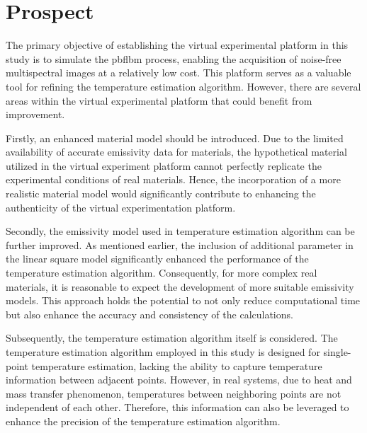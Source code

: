 \newpage
\section*{Prospect}
The primary objective of establishing the virtual experimental platform in this study is to 
simulate the \gls{pbflbm} process, enabling the acquisition of noise-free multispectral 
images at a relatively low cost. This platform serves as a valuable tool for refining 
the temperature estimation algorithm. However, there are several areas within the virtual 
experimental platform that could benefit from improvement.


Firstly, an enhanced material model should be introduced. Due to the limited availability 
of accurate emissivity data for materials, the hypothetical material utilized in the virtual 
experiment platform cannot perfectly replicate the experimental conditions of real materials. 
Hence, the incorporation of a more realistic material model would significantly contribute to 
enhancing the authenticity of the virtual experimentation platform.


Secondly, the emissivity model used in temperature estimation algorithm can be further 
improved. As mentioned earlier, the inclusion of additional parameter in the linear square 
model significantly enhanced the performance of the temperature estimation algorithm. 
Consequently, for more complex real materials, it is reasonable to expect the development of 
more suitable emissivity models. This approach holds the potential to not only reduce 
computational time but also enhance the accuracy and consistency of the calculations.


Subsequently, the temperature estimation algorithm itself is considered. The temperature 
estimation algorithm employed in this study is designed for single-point temperature estimation, 
lacking the ability to capture temperature information between adjacent points. 
However, in real systems, due to heat and mass transfer phenomenon, temperatures between 
neighboring points are not independent of each other. Therefore, this information can also be 
leveraged to enhance the precision of the temperature estimation algorithm.




